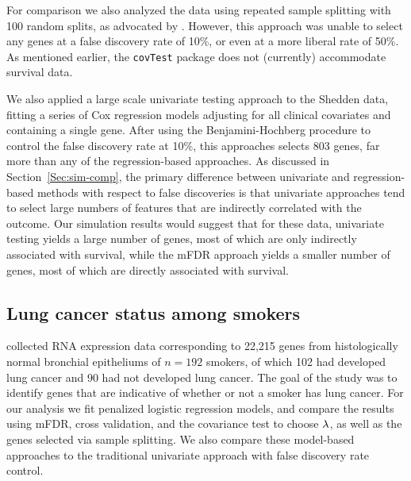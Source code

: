 For comparison we also analyzed the data using repeated sample splitting with 100 random splits, as advocated by  \citet{Meinshausen2009}. However, this approach was unable to select any genes at a false discovery rate of 10\%, or even at a more liberal rate of 50\%.
As mentioned earlier, the {\tt covTest} package does not (currently) accommodate survival data.

We also applied a large scale univariate testing approach to the Shedden data, fitting a series of Cox regression models adjusting for all clinical covariates and containing a single gene.  After using the Benjamini-Hochberg procedure to control the false discovery rate at 10\%, this approaches selects 803 genes, far more than any of the regression-based approaches.  As discussed in Section~\ref{Sec:sim-comp}, the primary difference between univariate and regression-based methods with respect to false discoveries is that univariate approaches tend to select large numbers of features that are indirectly correlated with the outcome.  Our simulation results would suggest that for these data, univariate testing yields a large number of genes, most of which are only indirectly associated with survival, while the mFDR approach yields a smaller number of genes, most of which are directly associated with survival.

\subsection{Lung cancer status among smokers}

\citet{Spira2007} collected RNA expression data corresponding to 22,215 genes from histologically normal bronchial epitheliums of $n = 192$ smokers, of which 102 had developed lung cancer and 90 had not developed lung cancer.
The goal of the study was to identify genes that are indicative of whether or not a smoker has lung cancer.  For our analysis we fit penalized logistic regression models, and compare the results using mFDR, cross validation, and the covariance test to choose $\lambda$, as well as the genes selected via sample splitting.   We also compare these model-based approaches to the traditional univariate approach with false discovery rate control.

